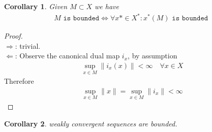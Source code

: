 \documentclass[a4paper,11pt,fleqn]{book}
\newtheorem{corollary}{Corollary}[theorem]
\theoremstyle{definition}
\theoremstyle{remark}
\begin{document}
\begin{corollary}
	Given $M \subset X$ we have
	\begin{align*}
		M \texttt{ is bounded} \Leftrightarrow \forall x* \in X^*:  x^*(M) \texttt{ is bounded }
	\end{align*}
\end{corollary}
\begin{proof}
\quad\\
$\Rightarrow$: trivial.\\
$\Leftarrow$: Observe the canonical dual map $i_x$, by assumption
\begin{align*}
	\sup_{x \in M} \|i_x(x)\| < \infty \quad \forall x \in X
\end{align*}
Therefore
\begin{align*}
	\sup_{x \in M} \|x\| = \sup_{x \in M}\|i_x\| < \infty
\end{align*}
\end{proof}

\begin{corollary}
	weakly convergent sequences are bounded. 
\end{corollary}
\end{document}
